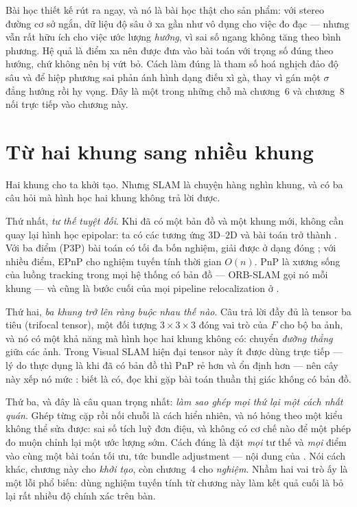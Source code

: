 \documentclass[../../vslam.tex]{subfiles}
\begin{document}
Bài học thiết kế rút ra ngay, và nó là bài học thật cho sản phẩm: với stereo đường cơ sở ngắn, dữ liệu độ sâu ở xa gần như vô dụng cho việc đo đạc --- nhưng vẫn rất hữu ích cho việc ước lượng \emph{hướng}, vì sai số ngang không tăng theo bình phương. Hệ quả là điểm xa nên được đưa vào bài toán với trọng số đúng theo hướng, chứ không nên bị vứt bỏ. Cách làm đúng là tham số hoá nghịch đảo độ sâu và để hiệp phương sai phản ánh hình dạng điếu xì gà, thay vì gán một \(\sigma\) đẳng hướng rồi hy vọng. Đây là một trong những chỗ mà chương~6 và chương~8 nối trực tiếp vào chương này.

\section{Từ hai khung sang nhiều khung}

Hai khung cho ta khởi tạo. Nhưng SLAM là chuyện hàng nghìn khung, và có ba câu hỏi mà hình học hai khung không trả lời được.

Thứ nhất, \emph{tư thế tuyệt đối}. Khi đã có một bản đồ và một khung mới, không cần quay lại hình học epipolar: ta có các tương ứng \(3\)D--\(2\)D và bài toán trở thành . Với ba điểm (P3P) bài toán có tối đa bốn nghiệm, giải được ở dạng đóng \cite{kneip2011p3p}; với nhiều điểm, EPnP \cite{lepetit2009epnp} cho nghiệm tuyến tính thời gian \(O(n)\). PnP là xương sống của luồng tracking trong mọi hệ thống có bản đồ --- ORB-SLAM gọi nó mỗi khung --- và cũng là bước cuối của mọi pipeline relocalization ở .

Thứ hai, \emph{ba khung trở lên ràng buộc nhau thế nào}. Câu trả lời đầy đủ là tensor ba tiêu (trifocal tensor), một đối tượng \(3\times3\times3\) đóng vai trò của \(F\) cho bộ ba ảnh, và nó có một khả năng mà hình học hai khung không có: chuyển \emph{đường thẳng} giữa các ảnh. Trong Visual SLAM hiện đại tensor này ít được dùng trực tiếp --- lý do thực dụng là khi đã có bản đồ thì PnP rẻ hơn và ổn định hơn --- nên cây này xếp nó mức : biết là có, đọc \cite[§15]{hartley2004} khi gặp bài toán thuần thị giác không có bản đồ.

Thứ ba, và đây là câu quan trọng nhất: \emph{làm sao ghép mọi thứ lại một cách nhất quán}. Ghép từng cặp rồi nối chuỗi là cách hiển nhiên, và nó hỏng theo một kiểu không thể sửa được: sai số tích luỹ đơn điệu, và không có cơ chế nào để một phép đo muộn chỉnh lại một ước lượng sớm. Cách đúng là đặt \emph{mọi} tư thế và \emph{mọi} điểm vào cùng một bài toán tối ưu, tức bundle adjustment --- nội dung của . Nói cách khác, chương này cho \emph{khởi tạo}, còn chương~4 cho \emph{nghiệm}. Nhầm hai vai trò ấy là một lỗi phổ biến: dùng nghiệm tuyến tính từ chương này làm kết quả cuối là bỏ lại rất nhiều độ chính xác trên bàn.
\end{document}
